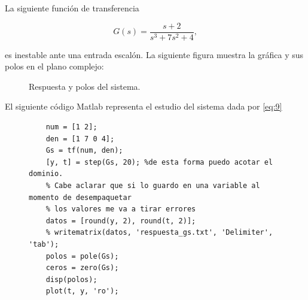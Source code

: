 \documentclass[twoside]{article}
\begin{document}
La siguiente función de transferencia

\begin{equation}
    \label{eq:9}
    G(s) = \frac{s + 2}{s^3 + 7s^2 + 4},
\end{equation}

\noindent es inestable ante una entrada escalón. La siguiente figura muestra la gráfica y sus polos en el plano complejo:


\begin{figure}[ht!]
    \begin{subfigure}{0.49\textwidth}
    \end{subfigure}
    \hfill
    \begin{subfigure}{0.49\textwidth}
    \end{subfigure}
    \caption{Respuesta y polos del sistema.}
    \label{fig:5}
\end{figure}



El siguiente código Matlab representa el estudio del sistema dada por \ref{eq:9}

\begin{figure}[ht!]
    \begin{lstlisting}[caption={Función transferencia ante una entrada escalón}, label={lst:2}]
    %así se define una función transferencia
    num = [1 2];
    den = [1 7 0 4];
    Gs = tf(num, den);
    [y, t] = step(Gs, 20); %de esta forma puedo acotar el dominio.
    % Cabe aclarar que si lo guardo en una variable al momento de desempaquetar 
    % los valores me va a tirar errores 
    datos = [round(y, 2), round(t, 2)];
    % writematrix(datos, 'respuesta_gs.txt', 'Delimiter', 'tab');
    polos = pole(Gs);
    ceros = zero(Gs);
    disp(polos);
    plot(t, y, 'ro');
    \end{lstlisting}
\end{figure}
\end{document}
